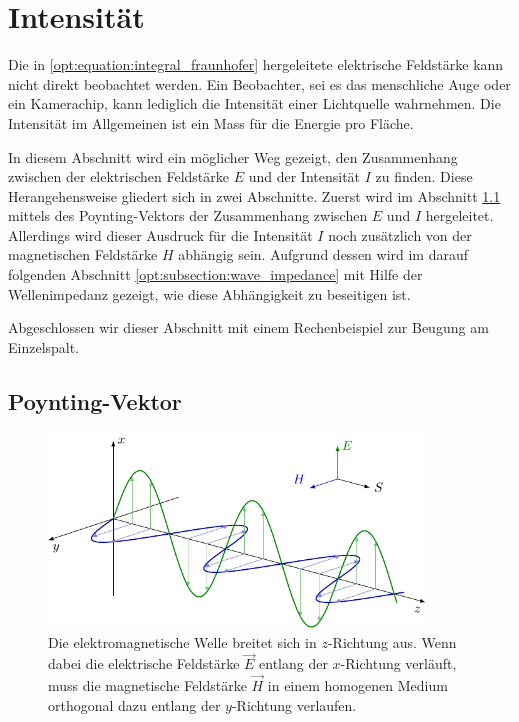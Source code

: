 %
%
%
%
\section{Intensität\label{opt:sec:intensity}}

Die in \eqref{opt:equation:integral_fraunhofer} hergeleitete elektrische Feldstärke kann nicht direkt beobachtet werden.
Ein Beobachter, sei es das menschliche Auge oder ein Kamerachip, kann lediglich die Intensität einer Lichtquelle wahrnehmen.
Die Intensität im Allgemeinen ist ein Mass für die Energie pro Fläche.

In diesem Abschnitt wird ein möglicher Weg gezeigt, den Zusammenhang zwischen der elektrischen Feldstärke $E$ und der Intensität $I$ zu finden.
Diese Herangehensweise gliedert sich in zwei Abschnitte.
Zuerst wird im Abschnitt \ref{opt:subsection:poynting_vector} mittels des Poynting-Vektors der Zusammenhang zwischen $E$ und $I$ hergeleitet.
Allerdings wird dieser Ausdruck für die Intensität $I$ noch zusätzlich von der magnetischen Feldstärke $H$ abhängig sein.
Aufgrund dessen wird im darauf folgenden Abschnitt \ref{opt:subsection:wave_impedance} mit Hilfe der Wellenimpedanz gezeigt, wie diese Abhängigkeit zu beseitigen ist.

Abgeschlossen wir dieser Abschnitt mit einem Rechenbeispiel zur Beugung am Einzelspalt.

\subsection{Poynting-Vektor}
\label{opt:subsection:poynting_vector}

\begin{figure}
    \centering
    \includegraphics[width=100mm]{papers/opt/images/electromagnetic_wave_1.pdf}
    \caption{Die elektromagnetische Welle breitet sich in $z$-Richtung aus. 
    Wenn dabei die elektrische Feldstärke $\vec{E}$ entlang der $x$-Richtung verläuft, muss die magnetische Feldstärke $\vec{H}$ 
    in einem homogenen Medium orthogonal dazu entlang der $y$-Richtung verlaufen.}
    \label{opt:fig:electromagnetic_wave_1}
\end{figure}


